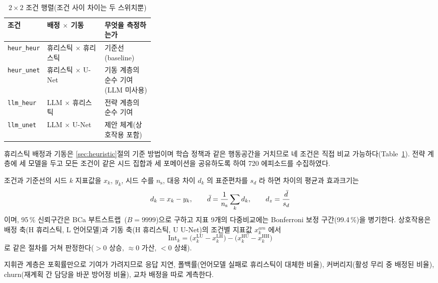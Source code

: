 \begin{table}[!htb]
\centering
\caption{$2\times2$ 조건 행렬(조건 사이 차이는 두 스위치뿐)}
\label{tab:conditions}
\footnotesize
\setlength{\tabcolsep}{3pt}
\begin{tabular}{llp{0.34\linewidth}}
\toprule
조건 & 배정 $\times$ 기동 & 무엇을 측정하는가 \\
\midrule
\texttt{heur\_heur} & 휴리스틱 $\times$ 휴리스틱 & 기준선(baseline) \\
\texttt{heur\_unet} & 휴리스틱 $\times$ U-Net    & 기동 계층의 순수 기여(LLM 미사용) \\
\texttt{llm\_heur}  & LLM $\times$ 휴리스틱      & 전략 계층의 순수 기여 \\
\texttt{llm\_unet}  & LLM $\times$ U-Net         & 제안 체계(상호작용 포함) \\
\bottomrule
\end{tabular}
\end{table}

휴리스틱 배정과 기동은 \ref{sec:heuristic}절의 기준 방법이며 학습 정책과 같은 행동공간을
거치므로 네 조건은 직접 비교 가능하다(Table~\ref{tab:conditions}). 전략 계층에 세 모델을 두고
모든 조건이 같은 시드 집합과 세 포메이션을 공유하도록 하여 720 에피소드를 수집하였다.

조건과 기준선의 시드 $k$ 지표값을 $x_k$, $y_k$, 시드 수를 $n_{\mathrm{s}}$, 대응 차이 $d_k$ 의
표준편차를 $s_d$ 라 하면 차이의 평균과 효과크기는
\begin{equation}
d_k = x_k - y_k, \qquad
\bar{d} = \frac{1}{n_{\mathrm{s}}}\sum_{k} d_k, \qquad
d_z = \frac{\bar{d}}{s_d}
\label{eq:paired}
\end{equation}
이며, 95\,\% 신뢰구간은 BCa 부트스트랩~\citep{efron1993bootstrap}($B = 9999$)으로 구하고
지표 9개의 다중비교에는 Bonferroni 보정 구간(99.4\,\%)을 병기한다. 상호작용은 배정 축(H 휴리스틱,
L 언어모델)과 기동 축(H 휴리스틱, U U-Net)의 조건별 지표값 $x_k^{am}$ 에서
\begin{equation}
\mathrm{Int}_k = \big(x_k^{\mathrm{LU}} - x_k^{\mathrm{LH}}\big)
               - \big(x_k^{\mathrm{HU}} - x_k^{\mathrm{HH}}\big)
\label{eq:interaction}
\end{equation}
로 같은 절차를 거쳐 판정한다($>0$ 상승, $\approx 0$ 가산, $<0$ 상쇄).

지휘관 계층은 포획률만으로 기여가 가려지므로 응답 지연, 폴백률(언어모델 실패로 휴리스틱이 대체한
비율), 커버리지(활성 무리 중 배정된 비율), churn(재계획 간 담당을 바꾼 방어정 비율), 교차 배정을
따로 계측한다.
